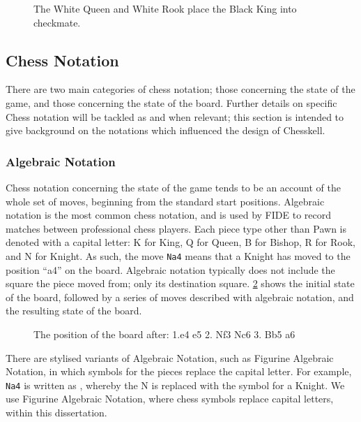 \begin{figure}[h]
    \centering
    \showboard
    \caption{The White Queen and White Rook place the Black King into checkmate.}
    \label{checkmate}
\end{figure}

\subsection{Chess Notation}

There are two main categories of chess notation; those concerning the state of the game, and those concerning the state of the board. Further details on specific Chess notation will be tackled as and when relevant; this section is intended to give background on the notations which influenced the design of Chesskell.

\subsubsection{Algebraic Notation} \label{algebraicsection}

Chess notation concerning the state of the game tends to be an account of the whole set of moves, beginning from the standard start positions. Algebraic notation is the most common chess notation, and is used by FIDE to record matches between professional chess players. Each piece type other than Pawn is denoted with a capital letter: K for King, Q for Queen, B for Bishop, R for Rook, and N for Knight. As such, the move \texttt{Na4} means that a Knight has moved to the position ``a4'' on the board. Algebraic notation typically does not include the square the piece moved from; only its destination square. \cref{algebraicexample} shows the initial state of the board, followed by a series of moves described with algebraic notation, and the resulting state of the board.

\begin{figure}[h]
    \centering
    \newgame
    \showboard
    \caption{The position of the board after: 1.e4 e5 2. Nf3 Nc6 3. Bb5 a6}
    \label{algebraicexample}
\end{figure}

There are stylised variants of Algebraic Notation, such as Figurine Algebraic Notation, in which symbols for the pieces replace the capital letter. For example, \texttt{Na4} is written as , whereby the N is replaced with the symbol for a Knight. We use Figurine Algebraic Notation, where chess symbols replace capital letters, within this dissertation.

